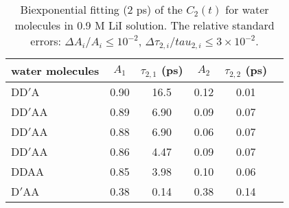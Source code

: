 \begin{table}[H]
\centering
\caption{\label{tab:fitting_c2_for_each_type_of_water}%
	Biexponential fitting (2 ps) of the $C_2(t)$ for water molecules in 0.9 M LiI solution. 
The relative standard errors: $\Delta A_i/A_i \le 10^{-2}$, $\Delta \tau_{2,i}/tau_{2,i} \le 3\times 10^{-2}$.}
\begin{tabular}{lccccc}
water molecules & $A_1$  & $\tau_{2,1}$ (ps) & $A_2$ & $\tau_{2,2}$ (ps) \\
\hline
DD$'$A & 0.90 & 16.5 & 0.12 & 0.01 \\
DD$'$AA & 0.89 & 6.90 & 0.09 & 0.07 \\
DD$'$AA & 0.88 & 6.90 & 0.06 & 0.07 \\
DD$'$AA & 0.86 & 4.47 & 0.09 & 0.07 \\
DDAA & 0.85 & 3.98 & 0.10 & 0.06 \\
D$'$AA & 0.38 & 0.14 & 0.38 & 0.14 \\
\end{tabular}
\end{table}
%

